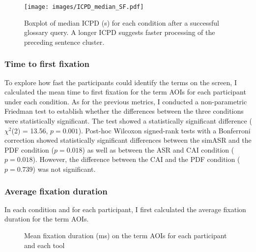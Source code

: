 \begin{figure}
\texttt{[image: images/ICPD\_median\_SF.pdf]}
\caption[Boxplot of median ICPD for terms searched/found]{Boxplot of median ICPD (s) for each condition after a successful glossary query. A longer ICPD suggests faster processing of the preceding sentence cluster.}
\label{fig:ICPDmedianSF}
\end{figure}

\subsubsection{Time to first fixation} \label{timetofirstfix}
To explore how fast the participants could identify the terms on the screen, I calculated the mean time to first fixation for the term AOIs for each participant under each condition. As for the previous metrics, I conducted a non-parametric Friedman test to establish whether the differences between the three conditions were statistically significant. The test showed a statistically significant difference ($\chi^2$(2) = 13.56, $p = 0.001$). Post-hoc Wilcoxon signed-rank tests with a Bonferroni correction showed statistically significant differences between the simASR and the PDF condition ($p = 0.018$) as well as between the ASR and CAI condition ($p = 0.018$). However, the difference between the CAI and the PDF condition ($p = 0.739$) was not significant.

\subsubsection{Average fixation duration} \label{fixation_dur}
In each condition and for each participant, I first calculated the average fixation duration for the term AOIs.

\begin{figure}
\caption[Mean fixation duration on term AOIs for each condition]{Mean fixation duration (ms) on the term AOIs for each participant and each tool}
\label{fig:meanfixdur}
\end{figure}

